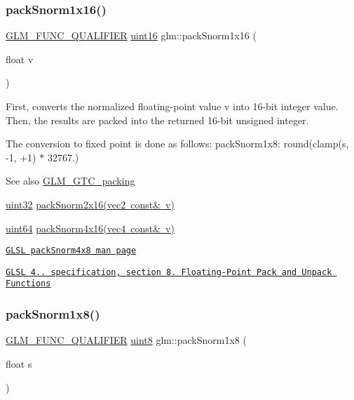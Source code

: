 \subsubsection{\texorpdfstring{pack\+Snorm1x16()}{packSnorm1x16()}}
{\footnotesize\ttfamily \mbox{\hyperlink{setup_8hpp_a33fdea6f91c5f834105f7415e2a64407}{G\+L\+M\+\_\+\+F\+U\+N\+C\+\_\+\+Q\+U\+A\+L\+I\+F\+I\+ER}} \mbox{\hyperlink{group__gtc__type__precision_gad8c2939e1fdd8e5828b31d95c52255d5}{uint16}} glm\+::pack\+Snorm1x16 (\begin{DoxyParamCaption}\item[{float}]{v }\end{DoxyParamCaption})}

First, converts the normalized floating-\/point value v into 16-\/bit integer value. Then, the results are packed into the returned 16-\/bit unsigned integer.

The conversion to fixed point is done as follows\+: pack\+Snorm1x8\+: round(clamp(s, -\/1, +1) $\ast$ 32767.)

\begin{DoxySeeAlso}{See also}
\mbox{\hyperlink{group__gtc__packing}{G\+L\+M\+\_\+\+G\+T\+C\+\_\+packing}} 

\mbox{\hyperlink{group__gtc__type__precision_ga202b6a53c105fcb7e531f9b443518451}{uint32}} \mbox{\hyperlink{group__core__func__packing_ga977ab172da5494e5ac63e952afacfbe2}{pack\+Snorm2x16(vec2 const\& v)}} 

\mbox{\hyperlink{group__gtc__type__precision_gae3632bf9b37da66233d78930dd06378a}{uint64}} \mbox{\hyperlink{group__gtc__packing_ga9b237d7c66b7a71964e6d1f4dc06539f}{pack\+Snorm4x16(vec4 const\& v)}} 

\href{http://www.opengl.org/sdk/docs/manglsl/xhtml/packSnorm4x8.xml}{\tt G\+L\+SL pack\+Snorm4x8 man page} 

\href{http://www.opengl.org/registry/doc/GLSLangSpec.4.20.8.pdf}{\tt G\+L\+SL 4.. specification, section 8. Floating-\/\+Point Pack and Unpack Functions} 
\end{DoxySeeAlso}
\mbox{\label{group__gtc__packing_ga26b6cd7a35c46c4b6a342f3b97b47423}} 
\subsubsection{\texorpdfstring{pack\+Snorm1x8()}{packSnorm1x8()}}
{\footnotesize\ttfamily \mbox{\hyperlink{setup_8hpp_a33fdea6f91c5f834105f7415e2a64407}{G\+L\+M\+\_\+\+F\+U\+N\+C\+\_\+\+Q\+U\+A\+L\+I\+F\+I\+ER}} \mbox{\hyperlink{group__gtc__type__precision_ga1a7dcd8aac97cc8020817c94049deff2}{uint8}} glm\+::pack\+Snorm1x8 (\begin{DoxyParamCaption}\item[{float}]{s }\end{DoxyParamCaption})}

